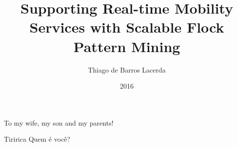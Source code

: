 \documentclass[en,oneside,onehalfspacing,msc]{risethesis/risethesis}
\title{Supporting Real-time Mobility Services with Scalable Flock Pattern Mining}
\date{2016}
\author{Thiago de Barros Lacerda}
\begin{document}
\frontmatter

\frontpage

\presentationpage

\begin{fichacatalografica}
\end{fichacatalografica}

\banca

\begin{dedicatory}
To my wife, my son and my parents!
\end{dedicatory}

\acknowledgements


\begin{epigraph}[]{Tiririca}
Quem é você?
\end{epigraph}

\resumo


\abstract


\listoffigures

\listoftables

\listofacronyms


\tableofcontents

\mainmatter









\begin{references}
  
\end{references}
\end{document}
